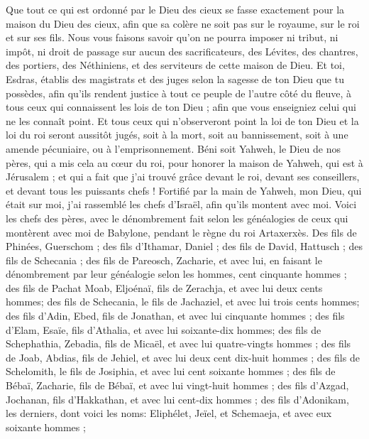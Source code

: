 \begin{multicols}{2}
Que tout ce qui est ordonné par le Dieu des cieux se fasse exactement pour la maison du Dieu des cieux, afin que sa colère ne soit pas sur le royaume, sur le roi et sur ses fils.
Nous vous faisons savoir qu'on ne pourra imposer ni tribut, ni impôt, ni droit de passage sur aucun des sacrificateurs, des Lévites, des chantres, des portiers, des  Néthiniens, et des serviteurs de cette maison de Dieu.
Et toi, Esdras, établis des magistrats et des juges selon la sagesse de ton Dieu que tu possèdes, afin qu'ils rendent justice à tout ce peuple de l'autre côté du fleuve, à tous ceux qui connaissent les lois de ton Dieu ; afin que vous enseigniez celui qui ne les connaît point.
Et tous ceux qui n'observeront point la loi de ton Dieu et la loi du roi seront aussitôt jugés, soit à la mort, soit au bannissement, soit à une amende pécuniaire, ou à l'emprisonnement.
Béni soit Yahweh, le Dieu de nos pères, qui a mis cela au cœur du roi, pour honorer la maison de Yahweh, qui est à Jérusalem ;
et qui a fait que j'ai trouvé grâce devant le  roi, devant ses conseillers, et devant tous les puissants chefs ! Fortifié par la main de Yahweh, mon Dieu, qui était sur moi, j'ai rassemblé les chefs d'Israël, afin qu'ils montent avec moi.
\VerseOne{}Voici les chefs des pères, avec le dénombrement fait selon les généalogies de ceux qui montèrent avec moi de Babylone, pendant le règne du roi Artaxerxès.
Des fils de Phinées, Guerschom ; des fils d'Ithamar, Daniel ; des fils de David, Hattusch ;
des fils de Schecania ; des fils de Pareosch, Zacharie, et avec lui, en faisant le dénombrement par leur généalogie selon les hommes, cent cinquante hommes ;
des fils de Pachat Moab, Eljoénaï, fils de Zerachja, et avec lui deux cents hommes;
des fils de Schecania, le fils de Jachaziel, et avec lui trois cents hommes;
des fils d'Adin, Ebed, fils de Jonathan, et avec lui cinquante hommes ;
des fils d'Elam, Esaïe, fils d'Athalia, et avec lui soixante-dix hommes;
des fils de Schephathia, Zebadia, fils de Micaël, et avec lui quatre-vingts hommes ;
des fils de Joab, Abdias, fils de Jehiel, et avec lui deux cent dix-huit hommes ;
des fils de Schelomith, le fils de Josiphia, et avec lui cent soixante hommes ;
des fils de Bébaï, Zacharie, fils de Bébaï, et avec lui vingt-huit hommes ;
des fils d'Azgad, Jochanan, fils d'Hakkathan, et avec lui cent-dix hommes ;
des fils d'Adonikam, les derniers, dont voici les noms: Eliphélet, Jeïel, et Schemaeja, et avec eux soixante hommes ;

\end{multicols}
